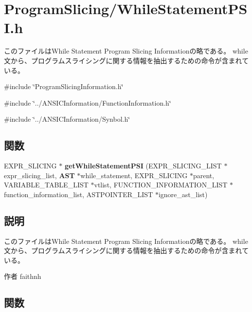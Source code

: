 \section{ProgramSlicing/WhileStatementPSI.h}
\label{WhileStatementPSI_8h}


このファイルはWhile Statement Program Slicing Informationの略である。 while文から、プログラムスライシングに関する情報を抽出するための命令が含まれている。  


{\ttfamily \#include \char`\"{}ProgramSlicingInformation.h\char`\"{}}\par
{\ttfamily \#include \char`\"{}../ANSICInformation/FunctionInformation.h\char`\"{}}\par
{\ttfamily \#include \char`\"{}../ANSICInformation/Synbol.h\char`\"{}}\par
\subsection*{関数}
\begin{DoxyCompactItemize}
\item 
EXPR\_\-SLICING $\ast$ {\bf getWhileStatementPSI} (EXPR\_\-SLICING\_\-LIST $\ast$expr\_\-slicing\_\-list, {\bf AST} $\ast$while\_\-statement, EXPR\_\-SLICING $\ast$parent, VARIABLE\_\-TABLE\_\-LIST $\ast$vtlist, FUNCTION\_\-INFORMATION\_\-LIST $\ast$function\_\-information\_\-list, ASTPOINTER\_\-LIST $\ast$ignore\_\-ast\_\-list)
\end{DoxyCompactItemize}


\subsection{説明}
このファイルはWhile Statement Program Slicing Informationの略である。 while文から、プログラムスライシングに関する情報を抽出するための命令が含まれている。 \begin{DoxyAuthor}{作者}
faithnh 
\end{DoxyAuthor}


\subsection{関数}
